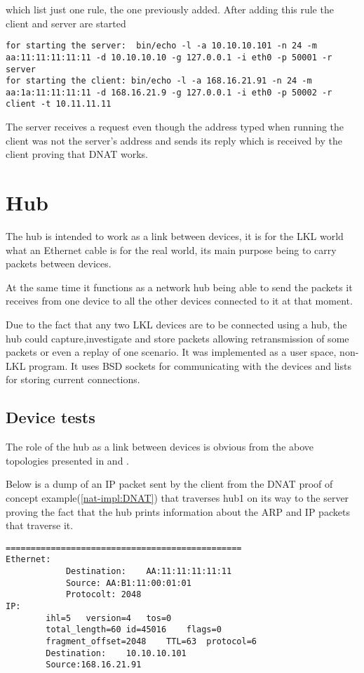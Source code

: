 {{\begin{itemize}
which list just one rule, the one previously added. 
After adding this rule the client and server are started
\lstset{language=TeX, caption=SNAT-starting client and server applications}
\begin{lstlisting}
for starting the server:  bin/echo -l -a 10.10.10.101 -n 24 -m aa:11:11:11:11:11 -d 10.10.10.10 -g 127.0.0.1 -i eth0 -p 50001 -r server
for starting the client: bin/echo -l -a 168.16.21.91 -n 24 -m aa:1a:11:11:11:11 -d 168.16.21.9 -g 127.0.0.1 -i eth0 -p 50002 -r client -t 10.11.11.11
\end{lstlisting}
 The server receives a request even though the address typed when running the client was not the server's address and sends its reply which is received by the client proving that DNAT works.
\end{itemize}
\section{Hub}
\label{sec:hub:impl}

The hub is intended to work as a link between devices, it is for the LKL world what an Ethernet cable is for the real world, its main purpose being to carry packets between devices.

At the same time it functions as a network hub being able to send the packets it receives from one device to all the other devices connected to it at that moment.

Due to the fact that any two LKL devices are to be connected using a hub, the hub could capture,investigate and store packets allowing retransmission of some packets or even a replay of one scenario.  
It was implemented as a user space, non-LKL program. It uses BSD sockets for communicating with the devices and lists for storing current connections.
\subsection{Device tests}
\label{sub-sec:router-tests}
The role of the hub as a link between devices is obvious from the above topologies presented in  and .

Below is a dump of an IP packet sent by the client from the DNAT proof of concept example(\ref{nat-impl:DNAT}) that traverses hub1 on its way to the server proving the fact that the hub prints information about the ARP and IP packets that traverse it.
\lstset{language=TeX, caption=Hub-print packet information}
\begin{lstlisting}
===============================================
Ethernet:
			Destination:	AA:11:11:11:11:11
			Source:	AA:B1:11:00:01:01
			Protocolt: 2048
IP:
		ihl=5	version=4	tos=0
		total_length=60	id=45016	flags=0
		fragment_offset=2048	TTL=63	protocol=6
		Destination:	10.10.10.101
		Source:168.16.21.91


\end{lstlisting}}}
